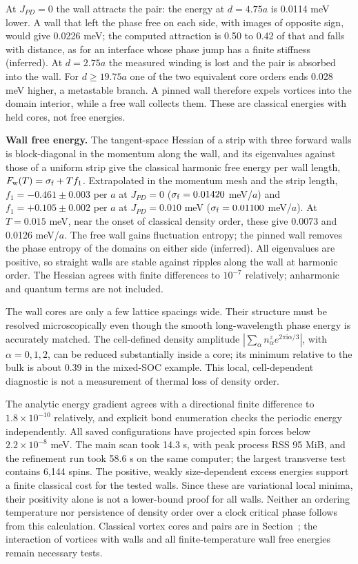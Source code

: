 At \(J_{PD}=0\) the wall attracts the pair: the energy at \(d=4.75a\) is
0.0114 meV lower. A wall that left the phase free on each side, with
images of opposite sign, would give 0.0226 meV; the computed attraction
is 0.50 to 0.42 of that and falls with distance, as for an interface
whose phase jump has a finite stiffness (inferred). At \(d=2.75a\) the
measured winding is lost and the pair is absorbed into the wall. For
\(d\ge19.75a\) one of the two equivalent core orders ends 0.028 meV
higher, a metastable branch. A pinned wall therefore expels vortices
into the domain interior, while a free wall collects them. These are
classical energies with held cores, not free energies.

\textbf{Wall free energy.} The tangent-space Hessian of a strip with
three forward walls is block-diagonal in the momentum along the wall,
and its eigenvalues against those of a uniform strip give the classical
harmonic free energy per wall length, \(F_{\rm w}(T)=\sigma_{\rm f}+Tf_1\).
Extrapolated in the momentum mesh and the strip length,
\(f_1=-0.461\pm0.003\) per \(a\) at \(J_{PD}=0\)
(\(\sigma_{\rm f}=0.01420\) meV/\(a\)) and \(f_1=+0.105\pm0.002\) per
\(a\) at \(J_{PD}=0.010\) meV (\(\sigma_{\rm f}=0.01100\) meV/\(a\)). At
\(T=0.015\) meV, near the onset of classical density order, these give
0.0073 and 0.0126 meV/\(a\). The free wall gains fluctuation entropy;
the pinned wall removes the phase entropy of the domains on either side
(inferred). All eigenvalues are positive, so straight walls are stable
against ripples along the wall at harmonic order. The Hessian agrees
with finite differences to \(10^{-7}\) relatively; anharmonic and
quantum terms are not included.

The wall cores are only a few lattice spacings wide. Their structure
must be resolved microscopically even though the smooth long-wavelength
phase energy is accurately matched. The cell-defined density amplitude
\(|\sum_\alpha n^z_\alpha e^{2\pi\mathrm i\alpha/3}|\), with
\(\alpha=0,1,2\), can be reduced substantially inside a core; its
minimum relative to the bulk is about 0.39 in the mixed-SOC example.
This local, cell-dependent diagnostic is not a measurement of thermal
loss of density order.

The analytic energy gradient agrees with a directional finite difference
to \(1.8\times10^{-10}\) relatively, and explicit bond enumeration
checks the periodic energy independently. All saved configurations have
projected spin forces below \(2.2\times10^{-8}\) meV. The main scan took
14.3 s, with peak process RSS 95 MiB, and the refinement run took 58.6 s
on the same computer; the largest transverse test contains 6,144 spins.
The positive, weakly size-dependent excess energies support a finite
classical cost for the tested walls. Since these are variational local
minima, their positivity alone is not a lower-bound proof for all walls.
Neither an ordering temperature nor persistence of density order over a
clock critical phase follows from this calculation. Classical vortex
cores and pairs are in Section~; the
interaction of vortices with walls and all finite-temperature wall free
energies remain necessary tests.

